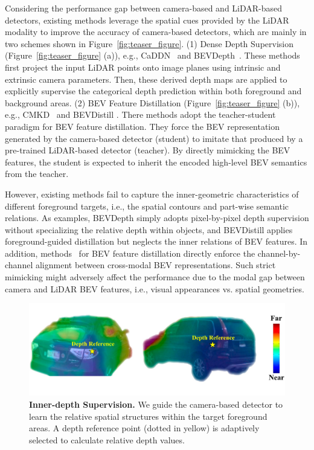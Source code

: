 Considering the performance gap between camera-based and LiDAR-based detectors, 
existing methods leverage the spatial cues provided by the LiDAR modality to improve the accuracy of camera-based detectors, which are mainly in two schemes shown in Figure~\ref{fig:teaser_figure}. (1) Dense Depth Supervision (Figure~\ref{fig:teaser_figure} (a)), e.g., CaDDN~\cite{b51} and BEVDepth~\cite{b7}. These methods first project the input LiDAR points onto image planes using intrinsic and extrinsic camera parameters. Then, these derived depth maps are applied to explicitly supervise the categorical depth prediction within both foreground and background areas. (2) BEV Feature Distillation (Figure~\ref{fig:teaser_figure} (b)), e.g., CMKD~\cite{b52} and BEVDistill \cite{b9}. There methods adopt the teacher-student paradigm for BEV feature distillation. They force the BEV representation generated by the camera-based detector (student) to imitate that produced by a pre-trained LiDAR-based detector (teacher). By directly mimicking the BEV features, the student is expected to inherit the encoded high-level BEV semantics from the teacher.

However, existing methods fail to capture the inner-geometric characteristics of different foreground targets, i.e., the spatial contours and part-wise semantic relations. As examples, BEVDepth simply adopts pixel-by-pixel depth supervision without specializing the relative depth within objects, and BEVDistill applies foreground-guided distillation but neglects the inner relations of BEV features. In addition, methods~\cite{b9,b52} for BEV feature distillation directly enforce the channel-by-channel alignment between cross-modal BEV representations. Such strict mimicking might adversely affect the performance due to the modal gap between camera and LiDAR BEV features, i.e., visual appearances vs. spatial geometries.

\begin{figure}[!t]
\vspace{0.1cm}
    \centering
    \includegraphics[scale=0.12]{cvpr_2022/depthref.jpeg}
    \caption{\textbf{Inner-depth Supervision.} We guide the camera-based detector to learn the relative spatial structures within the target foreground areas. A depth reference point (dotted in yellow) is adaptively selected to calculate relative depth values.}
    \label{fig:fig2}
\end{figure}

